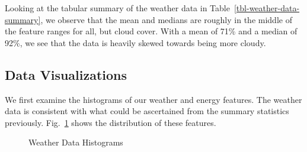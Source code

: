 \documentclass[
  journal,
]{IEEEtran}%
\begin{document}
Looking at the tabular summary of the weather data in
Table~\ref{tbl-weather-data-summary}, we observe that the mean and
medians are roughly in the middle of the feature ranges for all, but
cloud cover. With a mean of 71\% and a median of 92\%, we see that the
data is heavily skewed towards being more cloudy.

\begin{table}

\caption{\label{tbl-weather-data-summary}Weather Data Summary}


\end{table}%

\subsection{Data Visualizations}\label{data-visualizations}

We first examine the histograms of our weather and energy features. The
weather data is consistent with what could be ascertained from the
summary statistics previously.
Fig.~\ref{fig-weather-data-summary-histogram} shows the distribution of
these features.

\begin{figure}


\caption{\label{fig-weather-data-summary-histogram}Weather Data
Histograms}

\end{figure}%
\end{document}
